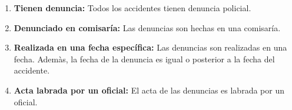 \begin{enumerate}
    \begin{enumerate}
      \item \textbf{Tienen denuncia:} Todos los accidentes tienen denuncia policial.
      \item \textbf{Denunciado en comisaría:} Las denuncias son hechas en una comisaría.
      \item \textbf{Realizada en una fecha específica:} Las denuncias son realizadas en una fecha. Ademàs, la fecha de la denuncia es igual o posterior a la fecha del accidente.
      \item \textbf{Acta labrada por un oficial:} El acta de las denuncias es labrada por un oficial.
    \end{enumerate}
\end{enumerate}





